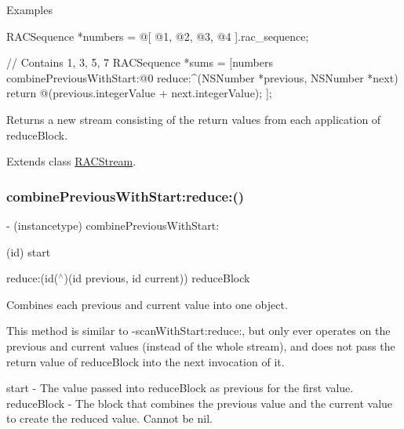 Examples \begin{DoxyVerb} RACSequence *numbers = @[ @1, @2, @3, @4 ].rac_sequence;

 // Contains 1, 3, 5, 7
 RACSequence *sums = [numbers combinePreviousWithStart:@0 reduce:^(NSNumber *previous, NSNumber *next) {
     return @(previous.integerValue + next.integerValue);
 }];
\end{DoxyVerb}


Returns a new stream consisting of the return values from each application of {\ttfamily reduce\+Block}. 

Extends class \mbox{\hyperlink{interface_r_a_c_stream_a698f6ef68be8d3cb34f9be6efaaa5af7}{R\+A\+C\+Stream}}.

\mbox{\label{category_r_a_c_stream_07_operations_08_a698f6ef68be8d3cb34f9be6efaaa5af7}} 
\subsubsection{\texorpdfstring{combine\+Previous\+With\+Start\+:reduce\+:()}{combinePreviousWithStart:reduce:()}\hspace{0.1cm}{\footnotesize\ttfamily [2/3]}}
{\footnotesize\ttfamily -\/ (instancetype) combine\+Previous\+With\+Start\+: \begin{DoxyParamCaption}\item[{(id)}]{start }\item[{reduce:(id($^\wedge$)(id previous, id current))}]{reduce\+Block }\end{DoxyParamCaption}}

Combines each previous and current value into one object.

This method is similar to -\/scan\+With\+Start\+:reduce\+:, but only ever operates on the previous and current values (instead of the whole stream), and does not pass the return value of {\ttfamily reduce\+Block} into the next invocation of it.

start -\/ The value passed into {\ttfamily reduce\+Block} as {\ttfamily previous} for the first value. reduce\+Block -\/ The block that combines the previous value and the current value to create the reduced value. Cannot be nil.

